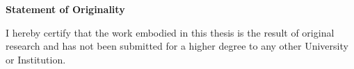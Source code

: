 \begin{titlepage}

\begin{center}
\Large{\bf{Statement of Originality}}
\end{center}

\vspace{0.2in}

\begin{spacing}{2}

I hereby certify that the work embodied in this thesis is the result of original research and has not been submitted for a higher degree to any other University or Institution.

\end{spacing}

\vspace{2.5cm}

\begin{center}
	\makebox[4cm]{\dotfill}  \hfill \makebox[4cm]{\dotfill}\\
	      \hfill {}
\end{center}
\end{titlepage}
\newpage